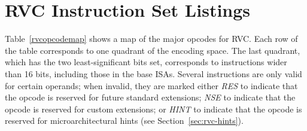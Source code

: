 \clearpage

\section{RVC Instruction Set Listings}

Table~\ref{rvcopcodemap} shows a map of the major opcodes for RVC.
Each row of the table corresponds to one quadrant of the encoding
space.  The last quadrant, which has the two
least-significant bits set, corresponds to instructions wider
than 16 bits, including those in the base ISAs.  Several instructions
are only valid for certain operands; when invalid, they are marked
either {\em RES} to indicate that the opcode is reserved for future
standard extensions; {\em NSE} to indicate that the opcode is reserved
for custom extensions; or {\em HINT} to indicate that the opcode
is reserved for microarchitectural hints (see Section~\ref{sec:rvc-hints}).



